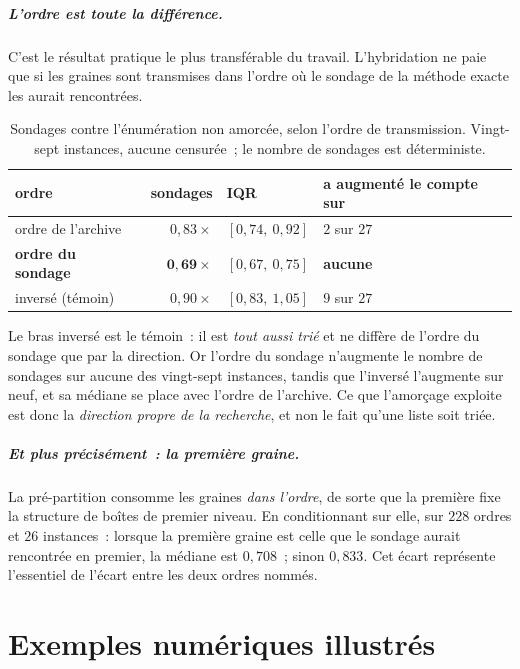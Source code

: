 \documentclass[12pt,a4paper]{report}
\theoremstyle{plain}
\theoremstyle{definition}
\begin{document}
\paragraph{L'ordre est toute la différence.}
C'est le résultat pratique le plus transférable du travail.  L'hybridation ne
paie que si les graines sont transmises dans l'ordre où le sondage de la
méthode exacte les aurait rencontrées.

\begin{table}[h]
\centering
\caption{Sondages contre l'énumération non amorcée, selon l'ordre de
transmission.  Vingt-sept instances, aucune censurée~; le nombre de sondages
est déterministe.}
\begin{tabular}{lrll}
\toprule
ordre & sondages & IQR & a augmenté le compte sur \\
\midrule
ordre de l'archive & $0{,}83\times$ & $[0{,}74,\ 0{,}92]$ & $2$ sur $27$ \\
\textbf{ordre du sondage} & $\mathbf{0{,}69}\times$ & $[0{,}67,\ 0{,}75]$ & \textbf{aucune} \\
inversé (témoin) & $0{,}90\times$ & $[0{,}83,\ 1{,}05]$ & $9$ sur $27$ \\
\bottomrule
\end{tabular}
\end{table}

\noindent
Le bras inversé est le témoin~: il est \emph{tout aussi trié} et ne diffère de
l'ordre du sondage que par la direction.  Or l'ordre du sondage n'augmente le
nombre de sondages sur aucune des vingt-sept instances, tandis que l'inversé
l'augmente sur neuf, et sa médiane se place avec l'ordre de l'archive.  Ce que
l'amorçage exploite est donc la \emph{direction propre de la recherche}, et non
le fait qu'une liste soit triée.

\paragraph{Et plus précisément~: la première graine.}
La pré-partition consomme les graines \emph{dans l'ordre}, de sorte que la
première fixe la structure de boîtes de premier niveau.  En conditionnant sur
elle, sur $228$ ordres et $26$ instances~: lorsque la première graine est celle
que le sondage aurait rencontrée en premier, la médiane est $0{,}708$~; sinon
$0{,}833$.  Cet écart représente l'essentiel de l'écart entre les deux ordres
nommés.



\chapter{Exemples numériques illustrés}
\label{ch:exemples}
\end{document}
